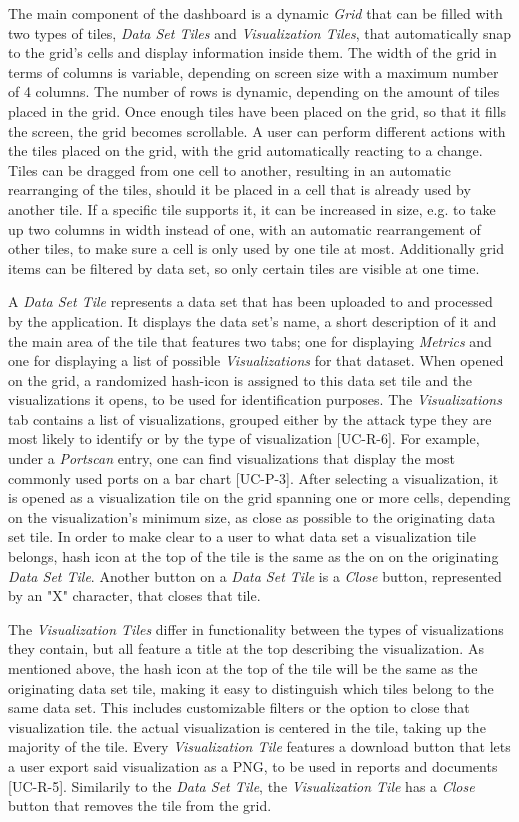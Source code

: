 The main component of the dashboard is a dynamic \emph{Grid} that can be filled with two types of tiles, \emph{Data Set Tiles} and \emph{Visualization Tiles}, that automatically snap to the grid's cells and display information inside them. The width of the grid in terms of columns is variable, depending on screen size with a maximum number of 4 columns. The number of rows is dynamic, depending on the amount of tiles placed in the grid. Once enough tiles have been placed on the grid, so that it fills the screen, the grid becomes scrollable.
A user can perform different actions with the tiles placed on the grid, with the grid automatically reacting to a change. Tiles can be dragged from one cell to another, resulting in an automatic rearranging of the tiles, should it be placed in a cell that is already used by another tile. If a specific tile supports it, it can be increased in size, e.g. to take up two columns in width instead of one, with an automatic rearrangement of other tiles, to make sure a cell is only used by one tile at most. Additionally grid items can be filtered by data set, so only certain tiles are visible at one time.

A \emph{Data Set Tile} represents a data set that has been uploaded to and processed by the application. It displays the data set's name, a short description of it and the main area of the tile that features two tabs; one for displaying \emph{Metrics} and one for displaying a list of possible \emph{Visualizations} for that dataset. When opened on the grid, a randomized hash-icon is assigned to this data set tile and the visualizations it opens, to be used for identification purposes. 
The \emph{Visualizations} tab contains a list of visualizations, grouped either by the attack type they are most likely to identify or by the type of visualization [UC-R-6]. For example, under a \emph{Portscan} entry, one can find visualizations that display the most commonly used ports on a bar chart [UC-P-3].
After selecting a visualization, it is opened as a visualization tile on the grid spanning one or more cells, depending on the visualization’s minimum size, as close as possible to the originating data set tile. In order to make clear to a user to what data set a visualization tile belongs, hash icon at the top of the tile is the same as the on on the originating \emph{Data Set Tile}. Another button on a \emph{Data Set Tile} is a \emph{Close} button, represented by an "X" character, that closes that tile.

The \emph{Visualization Tiles} differ in functionality between the types of visualizations they contain, but all feature a title at the top describing the visualization. As mentioned above, the hash icon at the top of the tile will be the same as the originating data set tile, making it easy to distinguish which tiles belong to the same data set. This includes customizable filters or the option to close that visualization tile. the actual visualization is centered in the tile, taking up the majority of the tile. Every \emph{Visualization Tile} features a download button that lets a user export said visualization as a PNG, to be used in reports and documents [UC-R-5]. Similarily to the \emph{Data Set Tile}, the \emph{Visualization Tile} has a \emph{Close} button that removes the tile from the grid.

